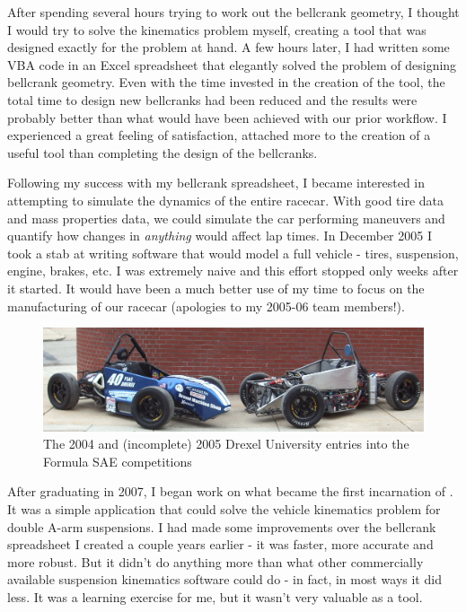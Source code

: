 After spending several hours trying to work out the bellcrank geometry, I thought I would try to solve the kinematics problem myself, creating a tool that was designed exactly for the problem at hand.  A few hours later, I had written some VBA code in an Excel spreadsheet that elegantly solved the problem of designing bellcrank geometry.  Even with the time invested in the creation of the tool, the total time to design new bellcranks had been reduced and the results were probably better than what would have been achieved with our prior workflow.  I experienced a great feeling of satisfaction, attached more to the creation of a useful tool than completing the design of the bellcranks.

Following my success with my bellcrank spreadsheet, I became interested in attempting to simulate the dynamics of the entire racecar.  With good tire data and mass properties data, we could simulate the car performing maneuvers and quantify how changes in \emph{anything} would affect lap times.  In December 2005 I took a stab at writing software that would model a full vehicle - tires, suspension, engine, brakes, etc.  I was extremely naive and this effort stopped only weeks after it started.  It would have been a much better use of my time to focus on the manufacturing of our racecar (apologies to my 2005-06 team members!).

\begin{figure}
  \includegraphics[width=\textwidth]{images/04-05cars}
  \caption{The 2004 and (incomplete) 2005 Drexel University entries into the Formula SAE competitions}
  \centering
\end{figure}

After graduating in 2007, I began work on what became the first incarnation of \vvase{}.  It was a simple application that could solve the vehicle kinematics problem for double A-arm suspensions.  I had made some improvements over the bellcrank spreadsheet I created a couple years earlier - it was faster, more accurate and more robust.  But it didn't do anything more than what other commercially available suspension kinematics software could do - in fact, in most ways it did less.  It was a learning exercise for me, but it wasn't very valuable as a tool.

